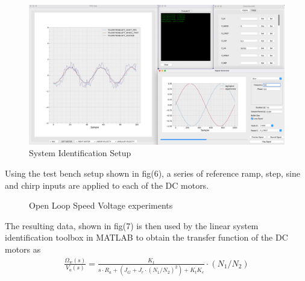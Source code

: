         \begin{figure}[H]
            \includegraphics[width=\textwidth]{SysIDMotorSetUp.png}
            \caption{System Identification Setup}
        \end{figure}
        Using the test bench setup shown in fig(6), a series of reference ramp, step, 
        sine and chirp inputs are applied to each of the DC motors. 

        \begin{figure}[H]
            \centering
            \caption{Open Loop Speed Voltage experiments}
        \end{figure}    
        The resulting data, shown in fig(7) is then used by the linear system identification toolbox in MATLAB 
        to obtain the transfer function of the DC motors as 
        \begin{equation}
            \begin{aligned}
                \frac{\Omega_w \left(s\right)}{V_a \left(s\right)}=\frac{K_t }{s\cdot R_a + \left(J_G +{J_r \cdot \left(N_1/N_2\right)}^2 \right)+K_t K_e }\cdot\left(N_1/N_2\right)
            \end{aligned}
        \end{equation}



        \pagebreak{}

